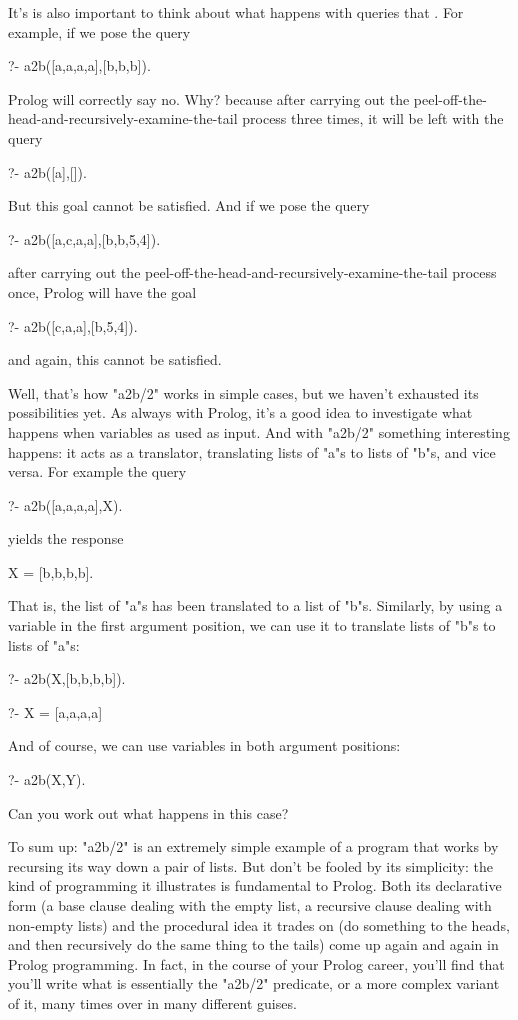 It's is also important to think about what  happens with queries
that . For example, if we pose the query
\begin{LPNcodedisplay}
?- a2b([a,a,a,a],[b,b,b]).
\end{LPNcodedisplay}
Prolog will correctly say no. Why? because after carrying out the
peel-off-the-head-and-recursively-examine-the-tail process three
times, it will be left with the query
\begin{LPNcodedisplay}
?- a2b([a],[]).
\end{LPNcodedisplay}
But this goal cannot be satisfied.
And if we pose the query
\begin{LPNcodedisplay}
?- a2b([a,c,a,a],[b,b,5,4]).
\end{LPNcodedisplay}
after carrying out the
peel-off-the-head-and-recursively-examine-the-tail process once,
Prolog will have the goal
\begin{LPNcodedisplay}
?- a2b([c,a,a],[b,5,4]).
\end{LPNcodedisplay}
and again, this cannot be satisfied.

Well, that's how "a2b/2" works in simple cases, but we
haven't exhausted its possibilities yet. As always with Prolog, it's a
good idea to investigate what happens when variables as used as
input. And with "a2b/2" something interesting happens: it
acts as a translator, translating lists of "a"s to lists of
"b"s, and vice versa.  For example the query
\begin{LPNcodedisplay}
?- a2b([a,a,a,a],X).
\end{LPNcodedisplay}
yields the response
\begin{LPNcodedisplay}
X = [b,b,b,b].
\end{LPNcodedisplay}
That is, the list of "a"s has been translated to a list of
"b"s. Similarly, by using a variable in the first argument
position, we can use it to translate lists of "b"s
to lists of "a"s:
\begin{LPNcodedisplay}
?- a2b(X,[b,b,b,b]).

?- X = [a,a,a,a]
\end{LPNcodedisplay}

And of course, we can use variables in both argument positions:
\begin{LPNcodedisplay}
?- a2b(X,Y).
\end{LPNcodedisplay}
Can you work out what happens in this case?

To sum up: "a2b/2" is an extremely simple example of a
program that works by recursing its way down a pair of lists. But
don't be fooled by its simplicity: the kind of programming it
illustrates is fundamental to Prolog.  Both its declarative form (a
base clause dealing with the empty list, a recursive clause dealing
with non-empty lists) and the procedural idea it trades on (do
something to the heads, and then recursively do the same thing to the
tails) come up again and again in Prolog programming. In fact, in the
course of your Prolog career, you'll find that you'll write what is
essentially the "a2b/2" predicate, or a more complex
variant of it, many times over in many different guises.

